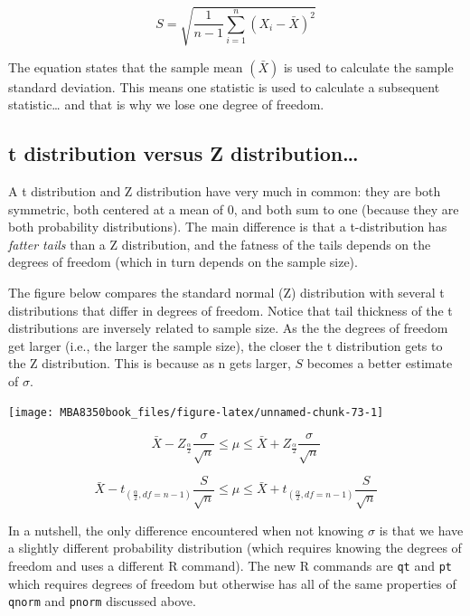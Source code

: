 \documentclass[
]{book}
\begin{document}
\[S = \sqrt{\frac{1}{n-1} \sum_{i=1}^n(X_i-\bar{X})^2}\]

The equation states that the sample mean \((\bar{X})\) is used to calculate the sample standard deviation. This means one statistic is used to calculate a subsequent statistic\ldots{} and that is why we lose one degree of freedom.

\hypertarget{t-distribution-versus-z-distribution}{%
\subsection{t distribution versus Z distribution\ldots{}}\label{t-distribution-versus-z-distribution}}

A t distribution and Z distribution have very much in common: they are both symmetric, both centered at a mean of 0, and both sum to one (because they are both probability distributions). The main difference is that a t-distribution has \emph{fatter tails} than a Z distribution, and the fatness of the tails depends on the degrees of freedom (which in turn depends on the sample size).

The figure below compares the standard normal (Z) distribution with several t distributions that differ in degrees of freedom. Notice that tail thickness of the t distributions are inversely related to sample size. As the the degrees of freedom get larger (i.e., the larger the sample size), the closer the t distribution gets to the Z distribution. This is because as n gets larger, \(S\) becomes a better estimate of \(\sigma\).

\begin{center}\texttt{[image: MBA8350book\_files/figure-latex/unnamed-chunk-73-1]} \end{center}

\[\bar{X}-Z_{\frac{\alpha}{2}}\frac{\sigma}{\sqrt{n}} \leq \mu \leq \bar{X}+Z_{\frac{\alpha}{2}}\frac{\sigma}{\sqrt{n}}\]

\[\bar{X}-t_{(\frac{\alpha}{2},df=n-1)}\frac{S}{\sqrt{n}} \leq \mu \leq \bar{X}+t_{(\frac{\alpha}{2},df=n-1)}\frac{S}{\sqrt{n}}\]

In a nutshell, the only difference encountered when not knowing \(\sigma\) is that we have a slightly different probability distribution (which requires knowing the degrees of freedom and uses a different R command). The new R commands are \texttt{qt} and \texttt{pt} which requires degrees of freedom but otherwise has all of the same properties of \texttt{qnorm} and \texttt{pnorm} discussed above.
\end{document}
